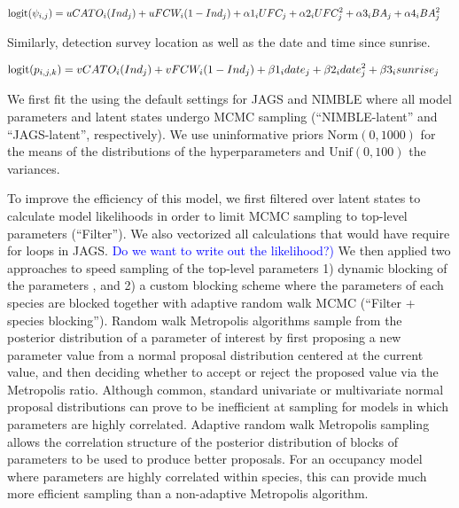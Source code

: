 \documentclass[12pt]{article}
\newcommand{\flagged}[1] {
  \textcolor{blue}{#1}
}
\begin{document}
\begin{equation}
  \begin{split}
    \label{eq:multispecies}
    \mathrm{logit}(\psi_{i,j}) &= uCATO_i(Ind_j) + uFCW_i(1-Ind_j) +
    \alpha1_iUFC_j + \alpha2_iUFC^2_j + \alpha3_iBA_j +
    \alpha4_iBA^2_j \hspace{0.2em}
  \end{split}
\end{equation}

Similarly, detection survey location as well as the date and time
since sunrise.

\begin{equation}
  \begin{split}
    \label{eq:multispecies_detection}
    \mathrm{logit}(p_{i,j,k}) &= vCATO_i(Ind_j) + vFCW_i(1-Ind_j) +
    \beta1_idate_j + \beta2_idate^2_j + \beta3_isunrise_j
    \hspace{0.2em}
  \end{split}
\end{equation}

We first fit the using the default settings for JAGS and NIMBLE where
all model parameters and latent states undergo MCMC sampling
(``NIMBLE-latent'' and ``JAGS-latent'', respectively). We use
uninformative priors $\mathrm{Norm}(0,1000)$ for the means of the
distributions of the hyperparameters and $\mathrm{Unif}(0,100)$ the
variances.

To improve the efficiency of this model, we first filtered over latent
states to calculate model likelihoods in order to limit MCMC sampling
to top-level parameters (``Filter''). We also vectorized all
calculations that would have require for loops in JAGS. \flagged{Do we
  want to write out the likelihood?)} We then applied two approaches
to speed sampling of the top-level parameters 1) dynamic blocking of
the parameters \citep[``Filter + autoblocking'',
][]{turek2016efficient}, and 2) a custom blocking scheme where the
parameters of each species are blocked together with adaptive random
walk MCMC (``Filter + species blocking''). Random walk Metropolis
algorithms \citep{metropolis1953equation} sample from the posterior
distribution of a parameter of interest by first proposing a new
parameter value from a normal proposal distribution centered at the
current value, and then deciding whether to accept or reject the
proposed value via the Metropolis ratio.  Although common, standard
univariate or multivariate normal proposal distributions can prove to
be inefficient at sampling for models in which parameters are highly
correlated.  Adaptive random walk Metropolis sampling
\citep{haario98anadaptive} allows the correlation structure of the
posterior distribution of blocks of parameters to be used to produce
better proposals.  For an occupancy model where parameters are highly
correlated within species, this can provide much more efficient
sampling than a non-adaptive Metropolis algorithm.
\end{document}
